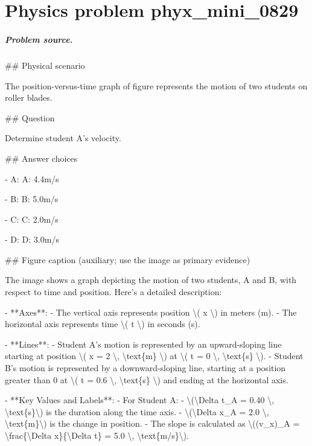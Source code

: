 
\chapter{Physics problem phyx\_mini\_0829}
\label{ch:PhyXMiniProblems_problem_phyx_mini_0829}

\paragraph{Problem source.}
\#\# Physical scenario

The position-versus-time graph of figure represents the motion of two students on roller blades.

\#\# Question

Determine student A's velocity.

\#\# Answer choices

- A: A: 4.4m/s

- B: B: 5.0m/s

- C: C: 2.0m/s

- D: D: 3.0m/s

\#\# Figure caption (auxiliary; use the image as primary evidence)

The image shows a graph depicting the motion of two students, A and B, with respect to time and position. Here's a detailed description:

- **Axes**: 
  - The vertical axis represents position \textbackslash{}( x \textbackslash{}) in meters (m).
  - The horizontal axis represents time \textbackslash{}( t \textbackslash{}) in seconds (s).

- **Lines**:
  - Student A's motion is represented by an upward-sloping line starting at position \textbackslash{}( x = 2 \textbackslash{}, \textbackslash{}text\{m\} \textbackslash{}) at \textbackslash{}( t = 0 \textbackslash{}, \textbackslash{}text\{s\} \textbackslash{}).
  - Student B's motion is represented by a downward-sloping line, starting at a position greater than 0 at \textbackslash{}( t = 0.6 \textbackslash{}, \textbackslash{}text\{s\} \textbackslash{}) and ending at the horizontal axis.

- **Key Values and Labels**:
  - For Student A:
    - \textbackslash{}(\textbackslash{}Delta t\_A = 0.40 \textbackslash{}, \textbackslash{}text\{s\}\textbackslash{}) is the duration along the time axis.
    - \textbackslash{}(\textbackslash{}Delta x\_A = 2.0 \textbackslash{}, \textbackslash{}text\{m\}\textbackslash{}) is the change in position.
    - The slope is calculated as \textbackslash{}((v\_x)\_A = \textbackslash{}frac\{\textbackslash{}Delta x\}\{\textbackslash{}Delta t\} = 5.0 \textbackslash{}, \textbackslash{}text\{m/s\}\textbackslash{}).

